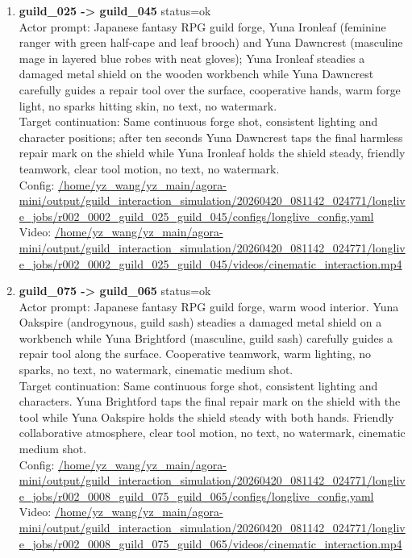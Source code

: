 \documentclass[11pt,a4paper]{article}
\begin{document}
\begin{enumerate}
\item \textbf{guild\_025 -> guild\_045} status=ok\\\newline Actor prompt: Japanese fantasy RPG guild forge, Yuna Ironleaf (feminine ranger with green half-cape and leaf brooch) and Yuna Dawncrest (masculine mage in layered blue robes with neat gloves); Yuna Ironleaf steadies a damaged metal shield on the wooden workbench while Yuna Dawncrest carefully guides a repair tool over the surface, cooperative hands, warm forge light, no sparks hitting skin, no text, no watermark.\\\newline Target continuation: Same continuous forge shot, consistent lighting and character positions; after ten seconds Yuna Dawncrest taps the final harmless repair mark on the shield while Yuna Ironleaf holds the shield steady, friendly teamwork, clear tool motion, no text, no watermark.\\\newline Config: \url{/home/yz\_wang/yz\_main/agora-mini/output/guild\_interaction\_simulation/20260420\_081142\_024771/longlive\_jobs/r002\_0002\_guild\_025\_guild\_045/configs/longlive\_config.yaml}\\\newline Video: \url{/home/yz\_wang/yz\_main/agora-mini/output/guild\_interaction\_simulation/20260420\_081142\_024771/longlive\_jobs/r002\_0002\_guild\_025\_guild\_045/videos/cinematic\_interaction.mp4}
\item \textbf{guild\_075 -> guild\_065} status=ok\\\newline Actor prompt: Japanese fantasy RPG guild forge, warm wood interior. Yuna Oakspire (androgynous, guild sash) steadies a damaged metal shield on a workbench while Yuna Brightford (masculine, guild sash) carefully guides a repair tool along the surface. Cooperative teamwork, warm lighting, no sparks, no text, no watermark, cinematic medium shot.\\\newline Target continuation: Same continuous forge shot, consistent lighting and characters. Yuna Brightford taps the final repair mark on the shield with the tool while Yuna Oakspire holds the shield steady with both hands. Friendly collaborative atmosphere, clear tool motion, no text, no watermark, cinematic medium shot.\\\newline Config: \url{/home/yz\_wang/yz\_main/agora-mini/output/guild\_interaction\_simulation/20260420\_081142\_024771/longlive\_jobs/r002\_0008\_guild\_075\_guild\_065/configs/longlive\_config.yaml}\\\newline Video: \url{/home/yz\_wang/yz\_main/agora-mini/output/guild\_interaction\_simulation/20260420\_081142\_024771/longlive\_jobs/r002\_0008\_guild\_075\_guild\_065/videos/cinematic\_interaction.mp4}

\end{enumerate}
\end{document}
